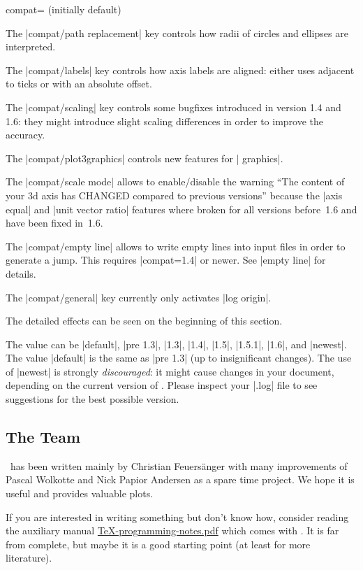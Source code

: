 \begin{pgfplotskey}{compat= (initially default)}
\begin{pgfplotskeylist}
	The |compat/path replacement| key controls how radii of circles and ellipses are interpreted.

	The |compat/labels| key controls how axis labels are aligned: either uses adjacent to ticks or with an absolute offset.

	The |compat/scaling| key controls some bugfixes introduced in version 1.4 and 1.6: they might introduce slight scaling differences in order to improve the accuracy.

	The |compat/plot3graphics| controls new features for | graphics|.

	The |compat/scale mode| allows to enable/disable the warning ``The content of your 3d axis has CHANGED compared to previous versions'' because the |axis equal| and |unit vector ratio| features where broken for all versions before~1.6 and have been fixed in~1.6.

	The |compat/empty line| allows to write empty lines into input files in order to generate a jump. This requires |compat=1.4| or newer. See |empty line| for details.

	The |compat/general| key currently only activates |log origin|.

	The detailed effects can be seen on the beginning of this section.
	\end{pgfplotskeylist}

	The value  can be |default|, |pre 1.3|, |1.3|, |1.4|, |1.5|, |1.5.1|, |1.6|, and |newest|. The value |default| is the same as |pre 1.3| (up to insignificant changes). The use of |newest| is strongly \emph{discouraged}: it might cause changes in your document, depending on the current version of \PGFPlots. Please inspect your |.log| file to see suggestions for the best possible version. 
\end{pgfplotskey}

\subsection{The Team}
\PGFPlots\ has been written mainly by Christian Feuersänger with many improvements of Pascal Wolkotte and Nick Papior Andersen as a spare time project. We hope it is useful and provides valuable plots.

If you are interested in writing something but don't know how, consider reading the auxiliary manual \href{file:TeX-programming-notes.pdf}{TeX-programming-notes.pdf} which comes with \PGFPlots. It is far from complete, but maybe it is a good starting point (at least for more literature).

